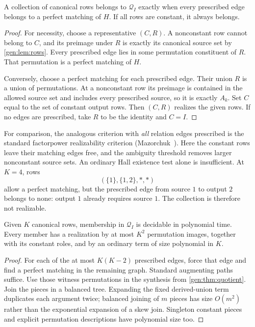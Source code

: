 \begin{proposition}\label{gen:thm:matching}
A collection of canonical rows belongs to $\mathcal Q_I$ exactly when
every prescribed edge belongs to a perfect matching of $H$. If all rows
are constant, it always belongs.
\end{proposition}
\begin{proof}
For necessity, choose a representative $(C,R)$. A nonconstant row
cannot belong to $C$, and its preimage under $R$ is exactly its canonical
source set by \cref{gen:lem:rows}. Every prescribed edge lies in some
permutation constituent of $R$. That permutation is a perfect matching
of $H$.

Conversely, choose a perfect matching for each prescribed edge. Their
union $R$ is a union of permutations. At a nonconstant row its preimage
is contained in the allowed source set and includes every prescribed
source, so it is exactly $A_k$. Set $C$ equal to the set of constant
output rows. Then $(C,R)$ realizes the given rows. If no edges are
prescribed, take $R$ to be the identity and $C=I$.
\end{proof}

For comparison, the analogous criterion with \emph{all} relation edges
prescribed is the standard factorpower realizability criterion
(Mazorchuk~\cite[Section~2.1]{Mazorchuk2009}). Here the constant rows leave
their matching edges free, and the ambiguity threshold removes larger
nonconstant source sets. An ordinary Hall existence test alone is
insufficient. At $K=4$, rows
\[
 (\{1\},\{1,2\},*,*)
\]
allow a perfect matching, but the prescribed edge from source $1$ to
output $2$ belongs to none: output $1$ already requires source $1$.
The collection is therefore not realizable.

\begin{corollary}
Given $K$ canonical rows, membership in $\mathcal Q_I$ is decidable in
polynomial time. Every member has a realization by at most $K^2$
permutation images, together with its constant roles, and by an ordinary
term of size polynomial in $K$.
\end{corollary}
\begin{proof}
For each of the at most $K(K-2)$ prescribed edges, force that edge and
find a perfect matching in the remaining graph. Standard augmenting
paths suffice. Use those witness permutations in the synthesis from
\cref{gen:thm:quotient}. Join the pieces in a balanced tree. Expanding
the fixed derived-union term duplicates each argument twice; balanced
joining of $m$ pieces has size $O(m^2)$ rather than the exponential
expansion of a skew join. Singleton constant pieces and explicit
permutation descriptions have polynomial size too.
\end{proof}

